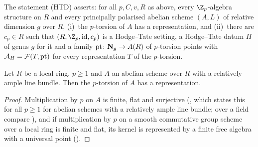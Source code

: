 \begin{definition}\label{pf:tower:def-htd}
The statement (HTD) asserts: for all $p,C,v,R$ as above, every $\Z_p$-algebra structure on $R$ and every
principally polarised abelian scheme $(A,L)$ of relative dimension $g$ over $R$,
(i)~the $p$-torsion of $A$ has a representation, and (ii)~there are $c_p\in R$ such that
$(R,\Z_p,\mathrm{id},c_p)$ is a Hodge--Tate setting, a Hodge--Tate datum $H$ of genus $g$ for it and a family
$\mathrm{pt}\colon\mathbf N_g\to A(R)$ of $p$-torsion points with $\mathcal A_H=\mathcal F(T,\mathrm{pt})$ for every
representation $T$ of the $p$-torsion.
\end{definition}

\begin{lemma}\label{pf:tower:torsrep}
Let $R$ be a local ring, $p\ge1$ and $A$ an abelian scheme over $R$ with a relatively ample line bundle. Then
the $p$-torsion of $A$ has a representation.
\end{lemma}

\begin{proof}
Multiplication by $p$ on $A$ is finite, flat and surjective
(, which states this for
all $p\ge1$ for abelian schemes with a relatively ample line bundle; over a field compare
\cite[\S6, Application~2]{Mumford1970}),
and if multiplication by $p$ on a smooth commutative group scheme over a local ring is finite and flat, its kernel is
represented by a finite free algebra with a universal point
().
\end{proof}

